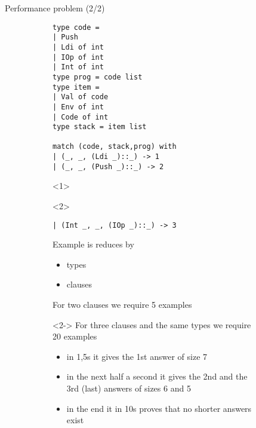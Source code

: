 \documentclass[aspectratio=169
  , xcolor={svgnames}
  , hyperref={ colorlinks,citecolor=Blue
             , linkcolor=DarkRed,urlcolor=DarkBlue}
  , russian
  ]{beamer}
\begin{document}
\begin{frame}[fragile]{Performance problem (2/2)}
\begin{figure}
\begin{subfigure}[b][6cm][b]{0.45\linewidth}
\begin{lstlisting}[basicstyle=\small]
type code = 
| Push 
| Ldi of int 
| IOp of int 
| Int of int 
type prog = code list 
type item = 
| Val of code 
| Env of int 
| Code of int
type stack = item list 

match (code, stack,prog) with
| (_, _, (Ldi _)::_) -> 1
| (_, _, (Push _)::_) -> 2
\end{lstlisting}
\begin{onlyenv}<1>
\vspace{4mm}
\end{onlyenv}
\begin{onlyenv}<2>
\begin{lstlisting}[basicstyle=\small,aboveskip=-0.5em]
| (Int _, _, (IOp _)::_) -> 3
\end{lstlisting}
\end{onlyenv}
\end{subfigure}
\hspace{.5cm}
\begin{subfigure}[b]{0.45\linewidth}
\begin{overlayarea}{7cm}{6cm}
Example is reduces by 
\begin{itemize}
\item types 
\item clauses
\end{itemize}
For two clauses we require 5 examples \\\vspace{1em}

\begin{onlyenv}<2->
For three clauses and the same types we require 20 examples
\begin{itemize}
\item in 1,5s it gives the  1st answer of size 7
\item in the next half a second it gives the 2nd and the 3rd (last) answers of sizes 6 and 5
\item in the end it in 10s proves that no shorter answers exist
\end{itemize}
\end{onlyenv}
\end{overlayarea}
\vspace{1cm}
\end{subfigure}
\end{figure}

\end{frame}
\end{document}
